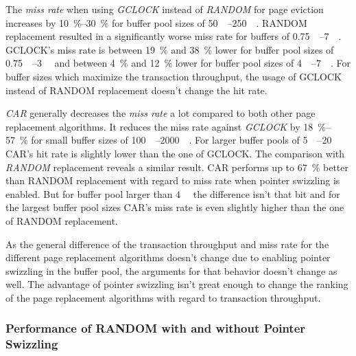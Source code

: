 	The \emph{miss rate} when using \emph{GCLOCK} instead of \emph{RANDOM} for page eviction increases by \SIrange{10}{30}{\percent} for buffer pool sizes of \SIrange{50}{250}{\mebi\byte}. RANDOM replacement resulted in a significantly worse miss rate for buffers of \SIrange{0.75}{7}{\gibi\byte}. GCLOCK's miss rate is between \SI{19}{\percent} and \SI{38}{\percent} lower for buffer pool sizes of \SIrange{0.75}{3}{\gibi\byte} and between \SI{4}{\percent} and \SI{12}{\percent} lower for buffer pool sizes of \SIrange{4}{7}{\gibi\byte}. For buffer sizes which maximize the transaction throughput, the usage of GCLOCK instead of RANDOM replacement doesn't change the hit rate.
	
	\emph{CAR} generally decreases the \emph{miss rate} a lot compared to both other page replacement algorithms. It reduces the miss rate against \emph{GCLOCK} by \SIrange{18}{57}{\percent} for small buffer sizes of \SIrange{100}{2000}{\mebi\byte}. For larger buffer pools of \SIrange{5}{20}{\gibi\byte} CAR's hit rate is slightly lower than the one of GCLOCK. The comparison with \emph{RANDOM} replacement reveals a similar result. CAR performs up to \SI{67}{\percent} better than RANDOM replacement with regard to miss rate when pointer swizzling is enabled. But for buffer pool larger than \SI{4}{\gibi\byte} the difference isn't that bit and for the largest buffer pool sizes CAR's miss rate is even slightly higher than the one of RANDOM replacement.
	
	As the general difference of the transaction throughput and miss rate for the different page replacement algorithms doesn't change due to enabling pointer swizzling in the buffer pool, the arguments for that behavior doesn't change as well. The advantage of pointer swizzling isn't great enough to change the ranking of the page replacement algorithms with regard to transaction throughput.
			
\subsubsection{Performance of RANDOM with and without Pointer Swizzling}

